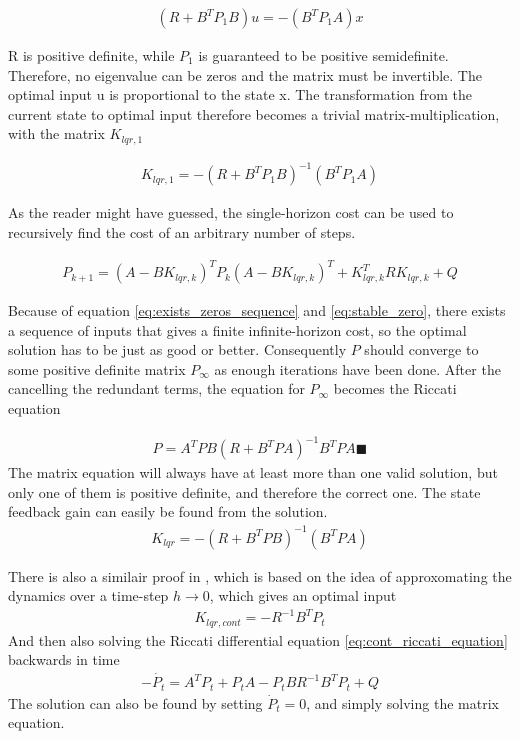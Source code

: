 \begin{align}
    \left( R + B^TP_1B \right)u = - \left( B^TP_1A \right)x
\end{align}

R is positive definite, while $P_1$ is guaranteed to be positive semidefinite. Therefore, no eigenvalue can be zeros and the matrix must be invertible. The optimal input u is proportional to the state x. The transformation from the current state to optimal input therefore becomes a trivial matrix-multiplication, with the matrix $K_{lqr,1}$

\begin{align}
    K_{lqr,1} = - \left( R + B^TP_1B \right)^{-1}\left( B^TP_1A \right)
\end{align}

\noindent
As the reader might have guessed, the single-horizon cost can be used to recursively find the cost of an arbitrary number of steps.

\begin{align}
    P_{k+1} = \left( A - BK_{lqr,k} \right)^TP_k \left( A - BK_{lqr,k} \right)^T + K_{lqr,k}^TRK_{lqr,k} + Q
\end{align}

\noindent
Because of equation \ref{eq:exists_zeros_sequence} and \ref{eq:stable_zero}, there exists a sequence of inputs that gives a finite infinite-horizon cost, so the optimal solution has to be just as good or better. Consequently $P$ should converge to some positive definite matrix $P_{\infty}$ as enough iterations have been done. After the cancelling the redundant terms, the equation for $P_{\infty}$ becomes the Riccati equation 

\begin{align}
    P = A^TPB \left( R + B^TPA \right)^{-1}B^TPA
    \blacksquare 
\end{align}
The matrix equation will always have at least more than one valid solution, but only one of them is positive definite, and therefore the correct one. The state feedback gain can easily be found from the solution. 
\begin{align}
    K_{lqr} = - \left( R + B^TPB \right)^{-1}\left( B^TPA \right)
\end{align}


\noindent
There is also a similair proof in \cite{cont_LQR_lecture}, which is based on the idea of approxomating the dynamics over a time-step $ h \rightarrow 0$, which gives an optimal input 
\begin{align}
    K_{lqr, cont}= - R^{-1}B^T P_t
\end{align}
And then also solving the Riccati differential equation \ref{eq:cont_riccati_equation} backwards in time
\begin{align}
    - \dot{P_t} =  A^TP_t + P_t A - P_t B R^{-1}B^T P_t + Q 
    \label{eq:cont_riccati_equation}
\end{align}
The solution can also be found by setting $\dot{P}_t =0$, and simply solving the matrix equation. 